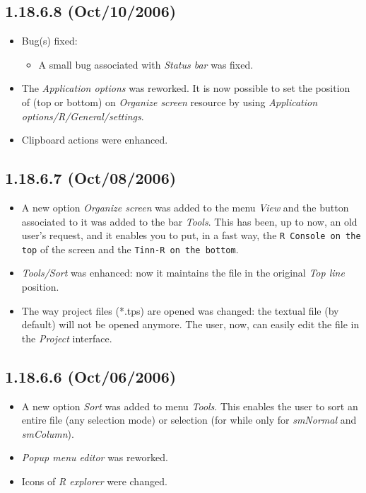 \subsection{1.18.6.8 (Oct/10/2006)}

\begin{itemize}
  \item Bug(s) fixed:
    \begin{itemize}
      \item A small bug associated with \textit{Status bar} was fixed.
    \end{itemize}
  \item The \textit{Application options} was reworked. It is now possible
    to set the position of \RR{} (top or bottom) on \textit{Organize screen}
    resource by using \textit{Application options/R/General/settings}.
  \item Clipboard actions were enhanced.
\end{itemize}


\subsection{1.18.6.7 (Oct/08/2006)}

\begin{itemize}
  \item A new option \textit{Organize screen} was added to the menu
    \textit{View} and the button associated to it was added to the
    bar \textit{Tools}. This has been, up to now, an old user's request,
    and it enables you to put, in a fast way, the \texttt{R Console on
      the top} of the screen and the \texttt{Tinn-R on the bottom}.
  \item \textit{Tools/Sort} was enhanced: now it maintains the file
    in the original \textit{Top line} position.
  \item The way project files (*.tps) are opened was changed: the
    textual file (by default) will not be opened anymore. The user,
    now, can easily edit the file in the \textit{Project} interface.
\end{itemize}


\subsection{1.18.6.6 (Oct/06/2006)}

\begin{itemize}
  \item A new option \textit{Sort} was added to menu \textit{Tools}.
    This enables the user to sort an entire file (any selection mode)
    or selection (for while only for \textit{smNormal} and
    \textit{smColumn}).
  \item \textit{Popup menu editor} was reworked.
  \item Icons of \textit{R explorer} were changed.
\end{itemize}


